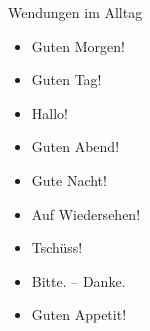 \begin{pragmatics}{Wendungen im Alltag}{}
\begin{itemize}
	\item Guten Morgen!
	\item Guten Tag!
	\item Hallo!
	\item Guten Abend!
	\item Gute Nacht!
	\item Auf Wiedersehen!
	\item Tschüss!
	\item Bitte. -- Danke.
	\item Guten Appetit!
\end{itemize}
\end{pragmatics}
